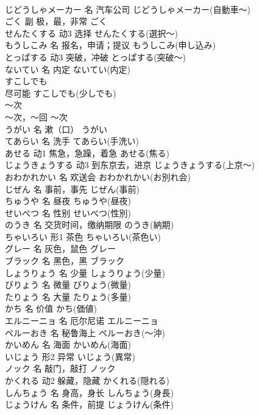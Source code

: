 \documentclass[8pt]{extreport}
\begin{document}
\begin{CJK}{UTF8}{min}
\\	じどうしゃメーカー	名	汽车公司	じどうしゃメーカー(自動車～)	
\\	ごく	副	极，最，非常	ごく	
\\	せんたくする	动3	选择	せんたくする(選択～)	
\\	もうしこみ	名	报名，申请；提议	もうしこみ(申し込み)	
\\	とっぱする	动3	突破，冲破	とっぱする(突破～)	
\\	ないてい	名	内定	ないてい(内定)	
\\	すこしでも	
\\	尽可能	すこしでも(少しでも)	
\\	～次	
\\	～次，～回	～次	
\\	うがい	名	漱（口）	うがい	
\\	てあらい	名	洗手	てあらい(手洗い)	
\\	あせる	动1	焦急，急躁，着急	あせる(焦る)	
\\	じょうきょうする	动3	到东京去，进京	じょうきょうする(上京～)	
\\	おわかれかい	名	欢送会	おわかれかい(お別れ会)	
\\	じぜん	名	事前，事先	じぜん(事前)	
\\	ちゅうや	名	昼夜	ちゅうや(昼夜)	
\\	せいべつ	名	性别	せいべつ(性別)	
\\	のうき	名	交货时间，缴纳期限	のうき(納期)	
\\	ちゃいろい	形1	茶色	ちゃいろい(茶色い)	
\\	グレー	名	灰色，鼠色	グレー	
\\	ブラック	名	黑色，黑	ブラック	
\\	しょうりょう	名	少量	しょうりょう(少量)	
\\	びりょう	名	微量	びりょう(微量)	
\\	たりょう	名	大量	たりょう(多量)	
\\	かち	名	价值	かち(価値)	
\\	エルニーニョ	名	厄尔尼诺	エルニーニョ	
\\	ペルーおき	名	秘鲁海上	ペルーおき(～沖)	
\\	かいめん	名	海面	かいめん(海面)	
\\	いじょう	形2	异常	いじょう(異常)	
\\	ノック	名	敲门，敲打	ノック	
\\	かくれる	动2	躲藏，隐藏	かくれる(隠れる)	
\\	しんちょう	名	身高，身长	しんちょう(身長)	
\\	じょうけん	名	条件，前提	じょうけん(条件)	

\end{CJK}
\end{document}
